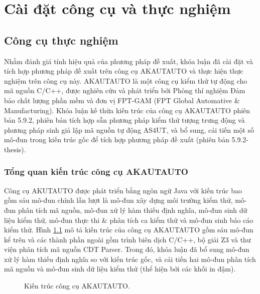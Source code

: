 \chapter{Cài đặt công cụ và thực nghiệm}\label{chap4}
\section{Công cụ thực nghiệm}
Nhằm đánh giá tính hiệu quả của phương pháp đề xuất, khóa luận đã cài đặt và tích hợp phương pháp đề xuất trên công cụ AKAUTAUTO và thực hiện thực nghiệm trên công cụ này. AKAUTAUTO là một công cụ kiểm thử tự động cho mã nguồn C/C++,  được nghiên cứu và phát triển bởi Phòng thí nghiệm Đảm bảo chất lượng phần mềm và đơn vị FPT-GAM (FPT Global Automative \& Manufacturing). Khóa luận kế thừa kiến trúc của công cụ AKAUTAUTO phiên bản 5.9.2, phiên bản tích hợp sẵn phương pháp kiểm thử tượng trưng động và phương pháp sinh giả lập mã nguồn tự động AS4UT, và bổ sung, cải tiến một số mô-đun trong kiến trúc gốc để tích hợp phương pháp đề xuất (phiên bản 5.9.2-thesis).

\subsection{Tổng quan kiến trúc công cụ AKAUTAUTO}
Công cụ AKUTAUTO được phát triển bằng ngôn ngữ Java với kiến trúc bao gồm sáu mô-đun chính lần lượt là mô-đun xây dựng môi trường kiểm thử, mô-đun phân tích mã nguồn, mô-đun xử lý hàm thiếu định nghĩa, mô-đun sinh dữ liệu kiểm thử, mô-đun thực thi \& phân tích ca kiểm thử và mô-đun sinh báo cáo kiểm thử. Hình \ref{fig:architect} mô tả kiến trúc của công cụ AKAUTAUTO gồm sáu mô-đun kể trên và các thành phần ngoài gồm trình biên dịch C/C++, bộ giải Z3 và thư viện phân tích mã nguồn CDT Parser. Trong đó, khóa luận đã bổ sung mô-đun xử lý hàm thiếu định nghĩa so với kiến trúc gốc, và cải tiến hai mô-đun phân tích mã nguồn và mô-đun sinh dữ liệu kiểm thử (thể hiện bởi các khối in đậm).

\begin{figure}[t]
    \centering
    
    \caption{Kiến trúc công cụ AKAUTAUTO.}
    \label{fig:architect}
\end{figure}

